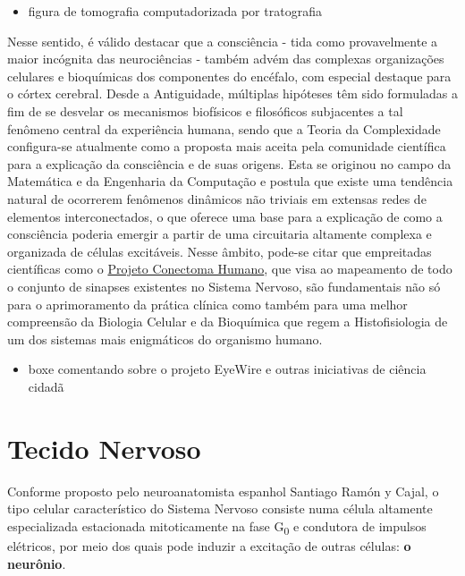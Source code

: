 \documentclass[
]{book}
\providecommand{\tightlist}{%
  \setlength{\itemsep}{0pt}\setlength{\parskip}{0pt}}
\theoremstyle{definition}
\theoremstyle{definition}
\theoremstyle{definition}
\theoremstyle{definition}
\theoremstyle{remark}
\begin{document}
\begin{itemize}
\tightlist
\item
  figura de tomografia computadorizada por tratografia
\end{itemize}

Nesse sentido, é válido destacar que a consciência - tida como provavelmente a maior incógnita das neurociências - também advém das complexas organizações celulares e bioquímicas dos componentes do encéfalo, com especial destaque para o córtex cerebral. Desde a Antiguidade, múltiplas hipóteses têm sido formuladas a fim de se desvelar os mecanismos biofísicos e filosóficos subjacentes a tal fenômeno central da experiência humana, sendo que a Teoria da Complexidade configura-se atualmente como a proposta mais aceita pela comunidade científica para a explicação da consciência e de suas origens. Esta se originou no campo da Matemática e da Engenharia da Computação e postula que existe uma tendência natural de ocorrerem fenômenos dinâmicos não triviais em extensas redes de elementos interconectados, o que oferece uma base para a explicação de como a consciência poderia emergir a partir de uma circuitaria altamente complexa e organizada de células excitáveis. Nesse âmbito, pode-se citar que empreitadas científicas como o \href{https://www.humanconnectome.org/}{Projeto Conectoma Humano}, que visa ao mapeamento de todo o conjunto de sinapses existentes no Sistema Nervoso, são fundamentais não só para o aprimoramento da prática clínica como também para uma melhor compreensão da Biologia Celular e da Bioquímica que regem a Histofisiologia de um dos sistemas mais enigmáticos do organismo humano.

\begin{itemize}
\tightlist
\item
  boxe comentando sobre o projeto EyeWire e outras iniciativas de ciência cidadã
\end{itemize}

\hypertarget{tecido-nervoso}{%
\section{Tecido Nervoso}\label{tecido-nervoso}}

Conforme proposto pelo neuroanatomista espanhol Santiago Ramón y Cajal, o tipo celular característico do Sistema Nervoso consiste numa célula altamente especializada estacionada mitoticamente na fase G\textsubscript{0} e condutora de impulsos elétricos, por meio dos quais pode induzir a excitação de outras células: \textbf{o neurônio}.
\end{document}
